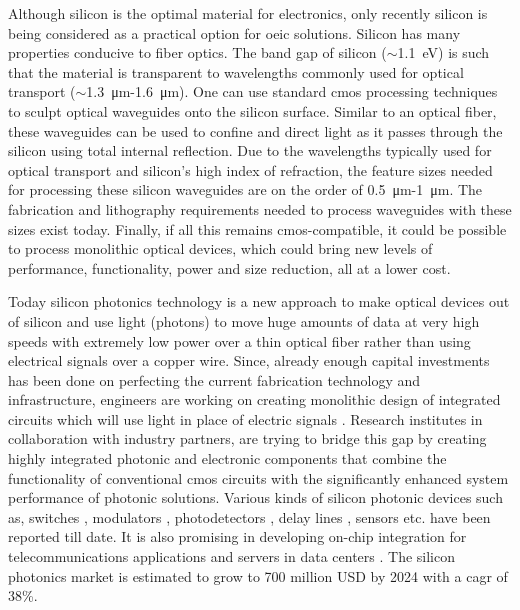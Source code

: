 \documentclass[../report.tex]{subfiles}
\begin{document}
Although silicon is the optimal material for electronics, only recently silicon is being considered as a practical option for \gls{oeic} solutions. Silicon has many properties conducive to fiber optics. The band gap of silicon ($\sim$\SI{1.1}{\electronvolt}) is such that the material is transparent to wavelengths commonly used for optical transport ($\sim$\SI{1.3}{\micro\metre}-\SI{1.6}{\micro\metre}). One can use standard \gls{cmos} processing techniques to sculpt optical waveguides onto the silicon surface. Similar to an optical fiber, these waveguides can be used to confine and direct light as it passes through the silicon \cite{reed_silicon_2004} using total internal reflection. Due to the wavelengths typically used for optical transport and silicon’s high index of refraction, the feature sizes needed for processing these silicon waveguides are on the order of \SI{0.5}{\micro\metre}-\SI{1}{\micro\metre}. The fabrication and lithography requirements needed to process waveguides with these sizes exist today. Finally, if all this remains \gls{cmos}-compatible, it could be possible to process monolithic optical devices, which could bring new levels of performance, functionality, power and size reduction, all at a lower cost. \par

Today silicon photonics technology is a new approach to make optical devices out of silicon and use light (photons) to move huge amounts of data at very high speeds with extremely low power over a thin optical fiber rather than using electrical signals over a copper wire. Since, already enough capital investments has been done on perfecting the current fabrication technology and infrastructure, engineers are working on creating monolithic design of integrated circuits which will use light in place of electric signals \cite{optical_linking}. Research institutes in collaboration with industry partners, are trying to bridge this gap by creating highly integrated photonic and electronic components that combine the functionality of conventional \gls{cmos} circuits with the significantly enhanced system performance of photonic solutions. Various kinds of silicon photonic devices such as, switches \cite{wu_mems-enabled_2015,nikolova_scaling_2015,lu_low-power_2014}, modulators \cite{dong_silicon_2015,chen_generation_2013}, photodetectors \cite{urino_demonstration_2012,chang_high-power_2015}, delay lines \cite{garcia_design_2015,mattarei_variable_2014}, sensors \cite{janz_silicon_2007,lim_laser_2010,ryckeboer_glucose_2014} etc. have been reported till date. It is also promising in developing on-chip integration for telecommunications applications and servers in data centers \cite{jalali_silicon_2006}. The silicon photonics market is estimated to grow to 700 million USD by 2024 \cite{silicon_photonics_growth_2015} with a \gls{cagr} of 38\%. 
\end{document}
